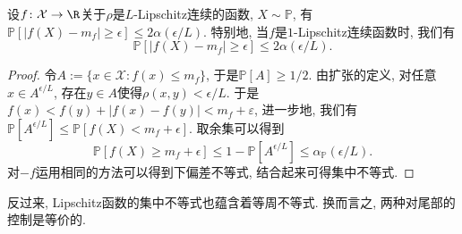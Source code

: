 \begin{theorem}[Lévy不等式]
	设$f \colon \mathcal{X} \to \R$关于$\rho$是$L$-Lipschitz连续的函数, $X \sim \mathbb{P}$, 有$\mathbb{P}[ |f(X) - m_f| \geq \epsilon] \leq 2 \alpha(\epsilon / L)$. 
	特别地, 当$f$是$1$-Lipschitz连续函数时, 我们有
	\begin{equation*}
		\mathbb{P}[ |f(X) - m_f| \geq \epsilon] \leq 2 \alpha(\epsilon / L). 
	\end{equation*}
\end{theorem}
\begin{proof}
	令$A := \{x \in \mathcal{X} \colon f(x) \leq m_f\}$, 于是$\mathbb{P}[A] \geq 1/2$. 
	由扩张的定义, 对任意$x \in A^{\epsilon / L}$, 存在$y \in A$使得$\rho(x,y) < \epsilon / L$. 
	于是$f(x) < f(y) + |f(x) - f(y)| < m_f + \varepsilon$, 进一步地, 我们有$\mathbb{P}[A^{\epsilon / L}] \leq \mathbb{P}[f(X) < m_f + \epsilon]$. 
	取余集可以得到
	\begin{equation*}
		\mathbb{P}[f(X) \geq m_f + \epsilon] 
		\leq 1 - \mathbb{P}[A^{\epsilon / L}] 
		\leq \alpha_{\mathbb{P}}(\epsilon / L). 
	\end{equation*}
	对$-f$运用相同的方法可以得到下偏差不等式, 结合起来可得集中不等式. 
\end{proof}

反过来, Lipschitz函数的集中不等式也蕴含着等周不等式. 
换而言之, 两种对尾部的控制是等价的. 

